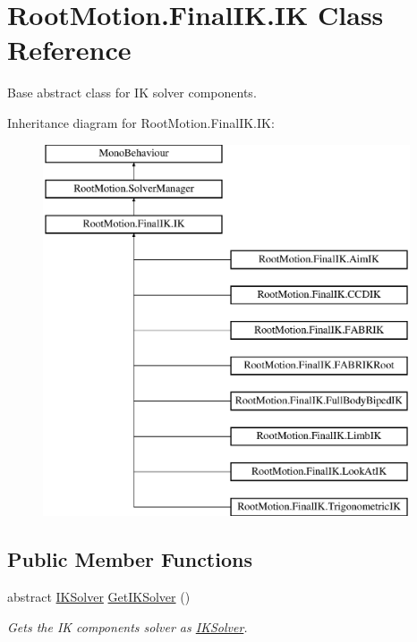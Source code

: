 \hypertarget{class_root_motion_1_1_final_i_k_1_1_i_k}{}\section{Root\+Motion.\+Final\+I\+K.\+IK Class Reference}
\label{class_root_motion_1_1_final_i_k_1_1_i_k}


Base abstract class for IK solver components.  


Inheritance diagram for Root\+Motion.\+Final\+I\+K.\+IK\+:\begin{figure}[H]
\begin{center}
\leavevmode
\includegraphics[height=11.000000cm]{class_root_motion_1_1_final_i_k_1_1_i_k}
\end{center}
\end{figure}
\subsection*{Public Member Functions}
\begin{DoxyCompactItemize}
\item 
abstract \mbox{\hyperlink{class_root_motion_1_1_final_i_k_1_1_i_k_solver}{I\+K\+Solver}} \mbox{\hyperlink{class_root_motion_1_1_final_i_k_1_1_i_k_ad9ef393e69cd16ba2d6fa06ba06b7a66}{Get\+I\+K\+Solver}} ()
\begin{DoxyCompactList}\small\item\em Gets the IK component\textquotesingle{}s solver as \mbox{\hyperlink{class_root_motion_1_1_final_i_k_1_1_i_k_solver}{I\+K\+Solver}}. \end{DoxyCompactList}\end{DoxyCompactItemize}
